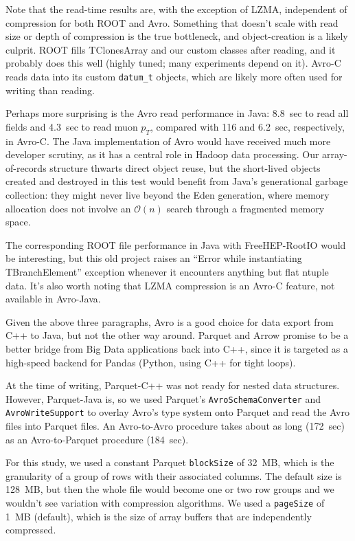 \documentclass{article}
\begin{document}
Note that the read-time results are, with the exception of LZMA, independent of compression for both ROOT and Avro. Something that doesn't scale with read size or depth of compression is the true bottleneck, and object-creation is a likely culprit. ROOT fills TClonesArray and our custom classes after reading, and it probably does this well (highly tuned; many experiments depend on it). Avro-C reads data into its custom {\tt datum\_t} objects, which are likely more often used for writing than reading.

Perhaps more surprising is the Avro read performance in Java: 8.8~sec to read all fields and 4.3~sec to read muon $p_T$, compared with 116 and 6.2~sec, respectively, in Avro-C. The Java implementation of Avro would have received much more developer scrutiny, as it has a central role in Hadoop data processing. Our array-of-records structure thwarts direct object reuse, but the short-lived objects created and destroyed in this test would benefit from Java's generational garbage collection: they might never live beyond the Eden generation, where memory allocation does not involve an $\mathcal{O}(n)$ search through a fragmented memory space.

The corresponding ROOT file performance in Java with FreeHEP-RootIO would be interesting, but this old project raises an ``Error while instantiating TBranchElement'' exception whenever it encounters anything but flat ntuple data. It's also worth noting that LZMA compression is an Avro-C feature, not available in Avro-Java.

Given the above three paragraphs, Avro is a good choice for data export from C++ to Java, but not the other way around. Parquet and Arrow promise to be a better bridge from Big Data applications back into C++, since it is targeted as a high-speed backend for Pandas (Python, using C++ for tight loops).

At the time of writing, Parquet-C++ was not ready for nested data structures. However, Parquet-Java is, so we used Parquet's {\tt AvroSchemaConverter} and {\tt AvroWriteSupport} to overlay Avro's type system onto Parquet and read the Avro files into Parquet files. An Avro-to-Avro procedure takes about as long (172~sec) as an Avro-to-Parquet procedure (184~sec). 

For this study, we used a constant Parquet {\tt blockSize} of 32~MB, which is the granularity of a group of rows with their associated columns. The default size is 128~MB, but then the whole file would become one or two row groups and we wouldn't see variation with compression algorithms. We used a {\tt pageSize} of 1~MB (default), which is the size of array buffers that are independently compressed.
\end{document}
